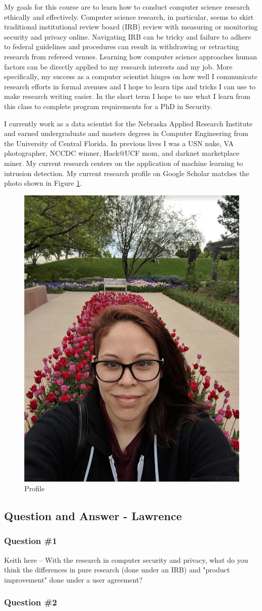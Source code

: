 My goals for this course are to learn how to conduct computer science research ethically and effectively. Computer science research, in particular, seems to skirt traditional institutional review board (IRB) review with measuring or monitoring security and privacy online. Navigating IRB can be tricky and failure to adhere to federal guidelines and procedures can result in withdrawing or retracting research from refereed venues. Learning how computer science approaches human factors can be directly applied to my research interests and my job. More specifically, my success as a computer scientist hinges on how well I communicate research efforts in formal avenues and I hope to learn tips and tricks I can use to make research writing easier. In the short term I hope to use what I learn from this class to complete program requirements for a PhD in Security.

I currently work as a data scientist for the Nebraska Applied Research Institute and earned undergraduate and masters degrees in Computer Engineering from the University of Central Florida. In previous lives I was a USN nuke, VA photographer, NCCDC winner, Hack@UCF mom, and darknet marketplace miner. My current research centers on the application of machine learning to intrusion detection. My current research profile on Google Scholar matches the photo shown in Figure \ref{fig:profile}.

\begin{figure}[h!]
   \centering
    \includegraphics[width=.35\textwidth]{lawrence.png}
    \caption{Profile}
    \label{fig:profile}
\end{figure}

\subsection{Question and Answer - Lawrence}
\subsubsection{Question \#1}
Keith here -- With the research in computer security and privacy, what do you think the differences in pure research (done under an IRB) and "product improvement" done under a user agreement?
\subsubsection{Question \#2}